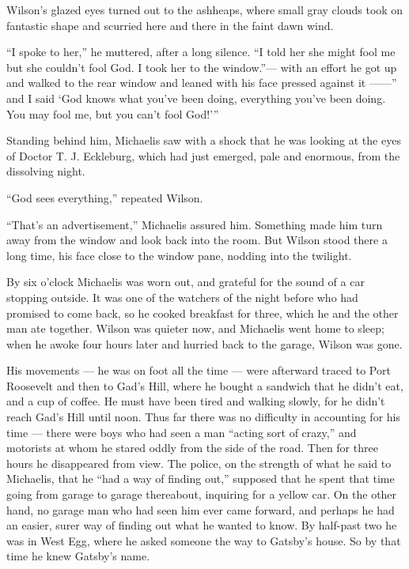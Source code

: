 \documentclass{znotebook}
\begin{document}
Wilson’s glazed eyes turned out to the ashheaps, where small gray clouds took on fantastic shape and scurried here and there in the faint dawn wind.

``I spoke to her,'' he muttered, after a long silence. ``I told her she might fool me but she couldn’t fool God. I took her to the window.''— with an effort he got up and walked to the rear window and leaned with his face pressed against it ——'' and I said ‘God knows what you’ve been doing, everything you’ve been doing. You may fool me, but you can’t fool God!’''

Standing behind him, Michaelis saw with a shock that he was looking at the eyes of Doctor T. J. Eckleburg, which had just emerged, pale and enormous, from the dissolving night.

``God sees everything,'' repeated Wilson.

``That’s an advertisement,'' Michaelis assured him. Something made him turn away from the window and look back into the room. But Wilson stood there a long time, his face close to the window pane, nodding into the twilight.

By six o’clock Michaelis was worn out, and grateful for the sound of a car stopping outside. It was one of the watchers of the night before who had promised to come back, so he cooked breakfast for three, which he and the other man ate together. Wilson was quieter now, and Michaelis went home to sleep; when he awoke four hours later and hurried back to the garage, Wilson was gone.

His movements — he was on foot all the time — were afterward traced to Port Roosevelt and then to Gad’s Hill, where he bought a sandwich that he didn’t eat, and a cup of coffee. He must have been tired and walking slowly, for he didn’t reach Gad’s Hill until noon. Thus far there was no difficulty in accounting for his time — there were boys who had seen a man ``acting sort of crazy,'' and motorists at whom he stared oddly from the side of the road. Then for three hours he disappeared from view. The police, on the strength of what he said to Michaelis, that he ``had a way of finding out,'' supposed that he spent that time going from garage to garage thereabout, inquiring for a yellow car. On the other hand, no garage man who had seen him ever came forward, and perhaps he had an easier, surer way of finding out what he wanted to know. By half-past two he was in West Egg, where he asked someone the way to Gatsby’s house. So by that time he knew Gatsby’s name.
\end{document}
